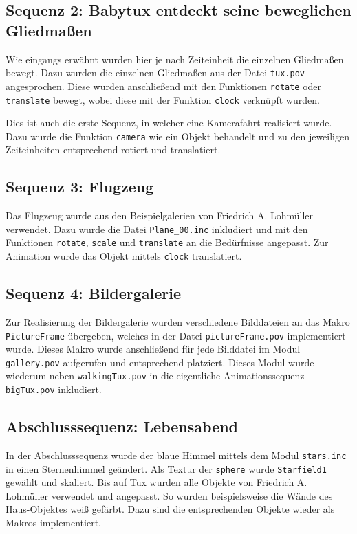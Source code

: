 \documentclass[11pt,parskip]{scrartcl}
\begin{document}
\subsection{Sequenz 2: Babytux entdeckt seine beweglichen Gliedmaßen}
Wie eingangs erwähnt wurden hier je nach Zeiteinheit die einzelnen Gliedmaßen
bewegt. Dazu wurden die einzelnen Gliedmaßen aus der Datei \texttt{tux.pov}
angesprochen. Diese wurden anschließend mit den Funktionen \texttt{rotate} oder
\texttt{translate} bewegt, wobei diese mit der Funktion \texttt{clock}
verknüpft wurden.

Dies ist auch die erste Sequenz, in welcher eine Kamerafahrt realisiert wurde.
Dazu wurde die Funktion \texttt{camera} wie ein Objekt behandelt und zu den
jeweiligen Zeiteinheiten entsprechend rotiert und translatiert.


\subsection{Sequenz 3: Flugzeug}
Das Flugzeug wurde aus den Beispielgalerien von Friedrich A. Lohmüller
\cite{f-lohmueller} verwendet.  Dazu wurde die Datei \texttt{Plane\_00.inc}
inkludiert und mit den Funktionen \texttt{rotate}, \texttt{scale} und
\texttt{translate} an die Bedürfnisse angepasst. Zur Animation wurde das Objekt
mittels \texttt{clock} translatiert.


\subsection{Sequenz 4: Bildergalerie}
Zur Realisierung der Bildergalerie wurden verschiedene Bilddateien an das Makro
\texttt{PictureFrame} übergeben, welches in der Datei \texttt{pictureFrame.pov}
implementiert wurde. Dieses Makro wurde anschließend für jede Bilddatei im
Modul \texttt{gallery.pov} aufgerufen und entsprechend platziert. Dieses Modul
wurde wiederum neben \texttt{walkingTux.pov} in die eigentliche
Animationssequenz \texttt{bigTux.pov} inkludiert.


\subsection{Abschlusssequenz: Lebensabend}
In der Abschlusssequenz wurde der blaue Himmel mittels dem Modul
\texttt{stars.inc} in einen Sternenhimmel geändert. Als Textur der
\texttt{sphere} wurde \texttt{Starfield1} gewählt und skaliert. Bis auf Tux
wurden alle Objekte von Friedrich A. Lohmüller \cite{f-lohmueller} verwendet
und angepasst. So wurden beispielsweise die Wände des Haus-Objektes weiß
gefärbt. Dazu sind die entsprechenden Objekte wieder als Makros implementiert.
\end{document}
